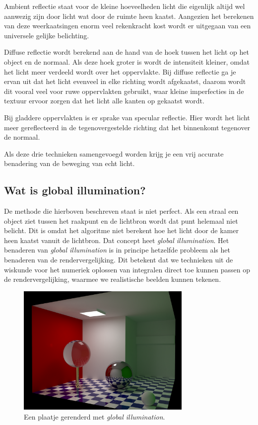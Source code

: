 \documentclass[12pt, a4paper]{article}
\begin{document}
Ambient reflectie staat voor de kleine hoeveelheden licht die eigenlijk altijd wel aanwezig zijn door licht wat door de ruimte heen kaatst. Aangezien het berekenen van deze weerkaatsingen enorm veel rekenkracht kost wordt er uitgegaan van een universele gelijke belichting. 

Diffuse reflectie wordt berekend aan de hand van de hoek tussen het licht op het object en de normaal. Als deze hoek groter is wordt de intensiteit kleiner, omdat het licht meer verdeeld wordt over het oppervlakte. Bij diffuse reflectie ga je ervan uit dat het licht evenveel in elke richting wordt afgekaatst, daarom wordt dit vooral veel voor ruwe oppervlakten gebruikt, waar kleine imperfecties in de textuur ervoor zorgen dat het licht alle kanten op gekaatst wordt.

Bij gladdere oppervlakten is er sprake van specular reflectie. Hier wordt het licht meer gereflecteerd in de tegenovergestelde richting dat het binnenkomt tegenover de normaal. 

Als deze drie technieken samengevoegd worden krijg je een vrij accurate benadering van de beweging van echt licht.

\subsection{Wat is global illumination?}
De methode die hierboven beschreven staat is niet perfect. Als een straal een object ziet tussen het raakpunt en de lichtbron wordt dat punt helemaal niet belicht. Dit is omdat het algoritme niet berekent hoe het licht door de kamer heen kaatst vanuit de lichtbron. Dat concept heet \emph{global illumination}. Het benaderen van \emph{global illumination} is in principe hetzelfde probleem als het benaderen van de rendervergelijking. Dit betekent dat we technieken uit de wiskunde voor het numeriek oplossen van integralen direct toe kunnen passen op de rendervergelijking, waarmee we realistische beelden kunnen tekenen. 

\begin{figure}[h]
    \centering
    \includegraphics[width=0.75\textwidth]{global_illumination.png}
    \caption{Een plaatje gerenderd met \emph{global illumination}.}
    \label{fig:global_illumination}
\end{figure}
\end{document}
